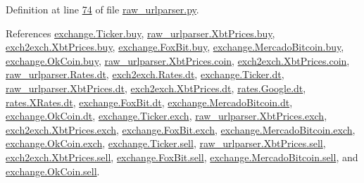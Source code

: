 Definition at line \hyperlink{raw__urlparser_8py_source_l00074}{74} of file \hyperlink{raw__urlparser_8py_source}{raw\+\_\+urlparser.\+py}.



References \hyperlink{exchange_8py_source_l00048}{exchange.\+Ticker.\+buy}, \hyperlink{raw__urlparser_8py_source_l00055}{raw\+\_\+urlparser.\+Xbt\+Prices.\+buy}, \hyperlink{exch2exch_8py_source_l00059}{exch2exch.\+Xbt\+Prices.\+buy}, \hyperlink{exchange_8py_source_l00235}{exchange.\+Fox\+Bit.\+buy}, \hyperlink{exchange_8py_source_l00297}{exchange.\+Mercado\+Bitcoin.\+buy}, \hyperlink{exchange_8py_source_l00362}{exchange.\+Ok\+Coin.\+buy}, \hyperlink{raw__urlparser_8py_source_l00057}{raw\+\_\+urlparser.\+Xbt\+Prices.\+coin}, \hyperlink{exch2exch_8py_source_l00065}{exch2exch.\+Xbt\+Prices.\+coin}, \hyperlink{raw__urlparser_8py_source_l00024}{raw\+\_\+urlparser.\+Rates.\+dt}, \hyperlink{exch2exch_8py_source_l00028}{exch2exch.\+Rates.\+dt}, \hyperlink{exchange_8py_source_l00047}{exchange.\+Ticker.\+dt}, \hyperlink{raw__urlparser_8py_source_l00053}{raw\+\_\+urlparser.\+Xbt\+Prices.\+dt}, \hyperlink{exch2exch_8py_source_l00057}{exch2exch.\+Xbt\+Prices.\+dt}, \hyperlink{rates_8py_source_l00090}{rates.\+Google.\+dt}, \hyperlink{rates_8py_source_l00146}{rates.\+X\+Rates.\+dt}, \hyperlink{exchange_8py_source_l00234}{exchange.\+Fox\+Bit.\+dt}, \hyperlink{exchange_8py_source_l00304}{exchange.\+Mercado\+Bitcoin.\+dt}, \hyperlink{exchange_8py_source_l00369}{exchange.\+Ok\+Coin.\+dt}, \hyperlink{exchange_8py_source_l00045}{exchange.\+Ticker.\+exch}, \hyperlink{raw__urlparser_8py_source_l00056}{raw\+\_\+urlparser.\+Xbt\+Prices.\+exch}, \hyperlink{exch2exch_8py_source_l00064}{exch2exch.\+Xbt\+Prices.\+exch}, \hyperlink{exchange_8py_source_l00228}{exchange.\+Fox\+Bit.\+exch}, \hyperlink{exchange_8py_source_l00294}{exchange.\+Mercado\+Bitcoin.\+exch}, \hyperlink{exchange_8py_source_l00359}{exchange.\+Ok\+Coin.\+exch}, \hyperlink{exchange_8py_source_l00049}{exchange.\+Ticker.\+sell}, \hyperlink{raw__urlparser_8py_source_l00054}{raw\+\_\+urlparser.\+Xbt\+Prices.\+sell}, \hyperlink{exch2exch_8py_source_l00058}{exch2exch.\+Xbt\+Prices.\+sell}, \hyperlink{exchange_8py_source_l00236}{exchange.\+Fox\+Bit.\+sell}, \hyperlink{exchange_8py_source_l00298}{exchange.\+Mercado\+Bitcoin.\+sell}, and \hyperlink{exchange_8py_source_l00363}{exchange.\+Ok\+Coin.\+sell}.


